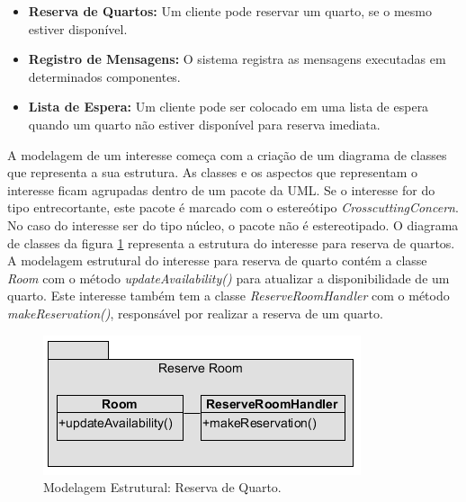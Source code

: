 \begin{itemize}
  \item \textbf{Reserva de Quartos:} Um cliente pode reservar um quarto, se o mesmo estiver disponível.
  \item \textbf{Registro de Mensagens:} O sistema registra as mensagens executadas em determinados componentes.
  \item \textbf{Lista de Espera:} Um cliente pode ser colocado em uma lista de espera quando um quarto não estiver disponível para reserva imediata.
\end{itemize}

A modelagem de um interesse começa com a criação de um diagrama de classes que representa a sua estrutura. As classes e os aspectos que
representam o interesse ficam agrupadas dentro de um pacote da UML. Se o interesse for do tipo entrecortante, este pacote é marcado com o estereótipo
\textit{CrosscuttingConcern}. No caso do interesse ser do tipo núcleo, o pacote não é estereotipado. O diagrama de classes da figura
\ref{fig:case_study_structural_reserve_room} representa a estrutura do interesse para reserva de quartos. A modelagem estrutural do interesse para 
reserva de quarto contém a classe \textit{Room} com o método \textit{updateAvailability()} para atualizar a disponibilidade de um quarto. Este
interesse também tem a classe \textit{ReserveRoomHandler} com o método \textit{makeReservation()}, responsável por realizar a reserva de um quarto.

  \begin{figure}
	\centering
	\includegraphics{img/case_study_structural_reserve_room.png}
	\caption{Modelagem Estrutural: Reserva de Quarto.}\label{fig:case_study_structural_reserve_room}
  \end{figure}


